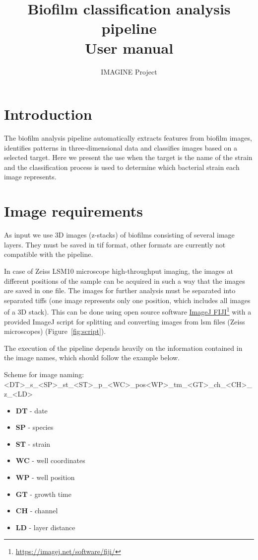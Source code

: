 \documentclass{ol-softwaremanual}
\title{Biofilm classification analysis pipeline\\User manual}
\author{IMAGINE Project}
\newcommand{\doclink}[2]{\href{#1}{#2}\footnote{\url{#1}}}
\begin{document}
\maketitle

\tableofcontents
\newpage

\section{Introduction}
The biofilm analysis pipeline automatically extracts features from biofilm images, identifies patterns in three-dimensional data and classifies images based on a selected target. Here we present the use when the target is the name of the strain and the classification process is used to determine which bacterial strain each image represents.

\section{Image requirements}
As input we use 3D images (z-stacks) of biofilms consisting of several image layers. They must be saved in tif format, other formats are currently not compatible with the pipeline.

In case of Zeiss LSM10 microscope high-throughput imaging, the images at different positions of the sample can be acquired in such a way that the images are saved in one file. The images for further analysis must be separated into separated tiffs (one image represents only one position, which includes all images of a 3D stack). This can be done using open source software \doclink{https://imagej.net/software/fiji/}{ImageJ FIJI} with a provided ImageJ script for splitting and converting images from lsm files (Zeiss microscopes) (Figure~\ref{fig:script}).

The execution of the pipeline depends heavily on the information contained in the image names, which should follow the example below.

Scheme for image naming:\\
<DT>\_s\_<SP>\_st\_<ST>\_p\_<WC>\_pos<WP>\_tm\_<GT>\_ch\_<CH>\_z\_<LD>

\begin{itemize}
	\item \textbf{DT} - date
	\item \textbf{SP} - species
	\item \textbf{ST} - strain
	\item \textbf{WC} - well coordinates
	\item \textbf{WP} - well position
	\item \textbf{GT} - growth time
	\item \textbf{CH} - channel
	\item \textbf{LD} - layer distance
\end{itemize}
\end{document}
